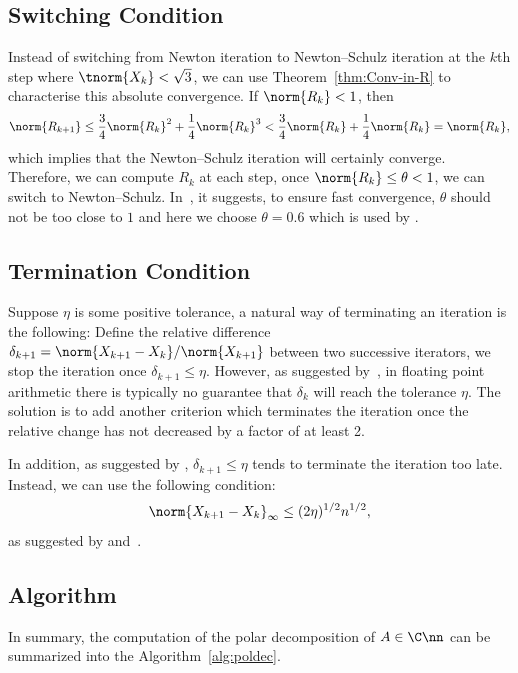 \documentclass{article}
\numberwithin{equation}{section} %
\newcommand{\gnorm}[1]{\norm{#1}}
\begin{document}
\subsection{Switching Condition}
Instead of switching from Newton iteration to Newton--Schulz iteration at
the $k$th step where $\tnorm{X_k} < \sqrt{3}$, we can use
Theorem~\ref{thm:Conv-in-R} to characterise this absolute convergence. If
$\gnorm{R_{k}} < 1$, then
\begin{equation}
  \notag 
  \gnorm{R_{k+1}} \leq \frac{3}{4}\gnorm{R_k}^2 + \frac{1}{4}\gnorm{R_k}^3 < \frac{3}{4}\gnorm{R_k} + \frac{1}{4}\gnorm{R_k} = \gnorm{R_k},
\end{equation}
which implies that the Newton--Schulz iteration will certainly converge.
Therefore, we can compute $R_{k}$ at each step, once
$\gnorm{R_k}\leq\theta<1$, we can switch to Newton--Schulz. In~, it suggests, to ensure fast convergence, $\theta$ should
not be too close to $1$ and here we choose $\theta = 0.6$ which is used by
\cite{hisc90}.

\subsection{Termination Condition}
Suppose $\eta$ is some positive tolerance, a natural way of terminating an
iteration is the following: Define the relative difference
$\delta_{k+1} = \gnorm{X_{k+1} - X_{k}}/\gnorm{X_{k+1}}$ between two
successive iterators, we stop the iteration once $\delta_{k+1} \leq \eta$.
However, as suggested by~, in
floating point arithmetic there is typically no guarantee that $\delta_k$
will reach the tolerance $\eta$. The solution is to add another criterion
which terminates the iteration once the relative change has not decreased
by a factor of at least 2.

In addition, as suggested by ,
$\delta_{k+1}\leq \eta$ tends to terminate the iteration too late. Instead,
we can use the following condition:
\begin{equation}
  \notag 
  \gnorm{X_{k+1} - X_{k}}_\infty \le (2\eta)^{1/2}n^{1/2},
\end{equation}
as suggested by  and~.

\subsection{Algorithm}
In summary, the computation of the polar decomposition of $A\in\C\nn$ can
be summarized into the Algorithm~\ref{alg:poldec}.
\end{document}
